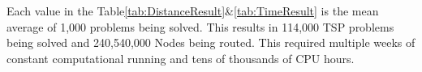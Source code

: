 Each value in the Table\ref{tab:DistanceResult}\&\ref{tab:TimeResult} is the mean average of 1,000 problems being solved. This results in 114,000 TSP problems being solved and 240,540,000 Nodes being routed. This required multiple weeks of constant computational running and tens of thousands of CPU hours.

\begin{landscape}
    

\end{landscape}
